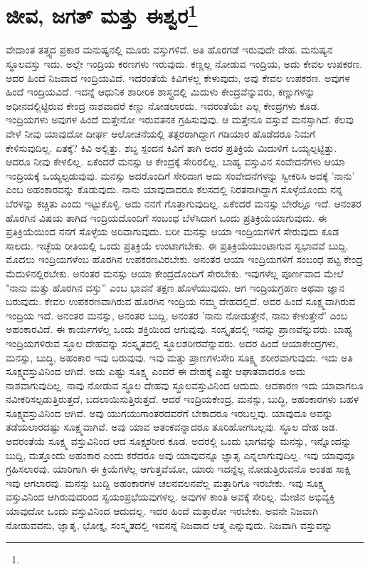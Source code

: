 
\chapter[ಜೀವ, ಜಗತ್ ಮತ್ತು ಈಶ್ವರ]{ಜೀವ, ಜಗತ್ ಮತ್ತು ಈಶ್ವರ\protect\footnote{}}

ವೇದಾಂತ ತತ್ತ್ವದ ಪ್ರಕಾರ ಮನುಷ್ಯನಲ್ಲಿ ಮೂರು ವಸ್ತುಗಳಿವೆ. ಅತಿ ಹೊರಗಡೆ ಇರುವುದೇ ದೇಹ. ಮನುಷ್ಯನ ಸ್ಥೂಲವಸ್ತು ಇದು. ಅಲ್ಲೇ ಇಂದ್ರಿಯ ಕರಣಗಳು ಇರುವುದು. ಕಣ್ಣಲ್ಲ ನೋಡುವ ಇಂದ್ರಿಯ, ಅದು ಕೇವಲ ಉಪಕರಣ. ಅದರ ಹಿಂದೆ ನಿಜವಾದ ಇಂದ್ರಿಯವಿದೆ. ಇದರಂತೆಯೆ ಕಿವಿಗಳಲ್ಲ ಕೇಳುವುದು, ಅವು ಕೇವಲ ಉಪಕರಣ. ಅವುಗಳ ಹಿಂದೆ ಇಂದ್ರಿಯವಿದೆ. ಇದನ್ನೆ ಆಧುನಿಕ ಶಾರೀರಿಕ ಶಾಸ್ತ್ರದಲ್ಲಿ ಮಿದುಳು ಕೇಂದ್ರವೆನ್ನುವರು, ಕಣ್ಣುಗಳನ್ನು ಅಧೀನದಲ್ಲಿಟ್ಟಿರುವ ಕೇಂದ್ರ ನಾಶವಾದರೆ ಕಣ್ಣು ನೋಡಲಾರದು. ಇದರಂತೆಯೇ ಎಲ್ಲ ಕೇಂದ್ರಗಳು ಕೂಡ. ಇಂದ್ರಿಯಗಳು ಅವುಗಳ ಹಿಂದೆ ಮತ್ತೇನೋ ಇರುವತನಕ ಗ್ರಹಿಸುವುವು. ಆ ಮತ್ತೇನೂ ವಸ್ತುವೆ ಮನಸ್ಸಾಗಿದೆ. ಕೆಲವು ವೇಳೆ ನೀವು ಯಾವುದೋ ದೀರ್ಘ ಆಲೋಚನೆಯಲ್ಲಿ ತತ್ಪರರಾಗಿದ್ದಾಗ ಗಡಿಯಾರ ಹೊಡೆದರೂ ನಿಮಗೆ ಕೇಳಿಸುವುದಿಲ್ಲ. ಏತಕ್ಕೆ? ಕಿವಿ ಅಲ್ಲಿತ್ತು. ಶಬ್ದ ಸ್ಪಂದನ ಕಿವಿಗೆ ತಾಗಿ ಅದರ ಪ್ರತಿಕ್ರಿಯೆ ಮಿದುಳಿಗೆ ಒಯ್ಯಲ್ಪಟ್ಟಿತ್ತು. ಆದರೂ ನೀವು ಕೇಳಲಿಲ್ಲ. ಏಕೆಂದರೆ ಮನಸ್ಸು ಆ ಕೇಂದ್ರಕ್ಕೆ ಸೇರಿರಲಿಲ್ಲ. ಬಾಹ್ಯ ವಸ್ತುವಿನ ಸಂವೇದನೆಗಳು ಆಯಾ ಇಂದ್ರಿಯಕ್ಕೆ ಒಯ್ಯಲ್ಪಡುವುವು. ಮನಸ್ಸು ಅದರೊಂದಿಗೆ ಸೇರಿದಾಗ ಅದು ಸಂವೇದನೆಗಳನ್ನು ಸ್ವೀಕರಿಸಿ ಅದಕ್ಕೆ 'ನಾನು' ಎಂಬ ಅಹಂಕಾರವನ್ನು ಕೊಡುವುದು. ನಾನು ಯಾವುದಾದರೂ ಕೆಲಸದಲ್ಲಿ ನಿರತನಾಗಿದ್ದಾಗ ಸೊಳ್ಳೆಯೊಂದು ನನ್ನ ಬೆರಳನ್ನು ಕಚ್ಚಿತು ಎಂದು ಇಟ್ಟುಕೊಳ್ಳಿ. ಅದು ನನಗೆ ಗೊತ್ತಾಗುವುದಿಲ್ಲ. ಏಕೆಂದರೆ ಮನಸ್ಸು ಬೇರೆಲ್ಲೂ ಇದೆ. ಆನಂತರ ಹೊರಗಿನ ವಿಷಯ ತಾಗಿದ ಇಂದ್ರಿಯದೊಂದಿಗೆ ಸಂಬಂಧ ಬೆಳೆಸಿದಾಗ ಒಂದು ಪ್ರತಿಕ್ರಿಯೆಯಾಗುವುದು. ಈ ಪ್ರತಿಕ್ರಿಯೆಯಿಂದ ನನಗೆ ಸೊಳ್ಳೆಯ ಅರಿವಾಗುವುದು. ಬರೀ ಮನಸ್ಸು ಆಯಾ ಇಂದ್ರಿಯಗಳಿಗೆ ಸೇರುವುದು ಕೂಡ ಸಾಲದು. ಇಚ್ಛೆಯ ರೀತಿಯಲ್ಲಿ ಒಂದು ಪ್ರತಿಕ್ರಿಯೆ ಉಂಟಾಗಬೇಕು. ಈ ಪ್ರತಿಕ್ರಿಯೆಯುಂಟಾಗುವ ಸ್ವಭಾವವೆ ಬುದ್ದಿ. ಮೊದಲು ಇಂದ್ರಿಯಗಳೆಂಬ ಹೊರಗಿನ ಉಪಕರಣವಿರಬೇಕು. ಅನಂತರ ಆಯಾ ಇಂದ್ರಿಯಗಳಿಗೆ ಸಂಬಂಧ ಪಟ್ಟ ಕೇಂದ್ರ ಮೆದುಳಿನಲ್ಲಿರಬೇಕು. ಅನಂತರ ಮನಸ್ಸು ಆಯಾ ಕೇಂದ್ರದೊಂದಿಗೆ ಸೇರಬೇಕು. ಇವುಗಳೆಲ್ಲ ಪೂರ್ಣವಾದ ಮೇಲೆ "ನಾನು ಮತ್ತು ಹೊರಗಿನ ವಸ್ತು” ಎಂಬ ಭಾವನೆ ತಕ್ಷಣ ಹೊಳೆಯುವುದು. ಆಗ ಇಂದ್ರಿಯಗ್ರಹಣ ಅಥವಾ ಜ್ಞಾನ ಬರುವುದು. ಕೇವಲ ಉಪಕರಣವಾಗಿರುವ ಹೊರಗಿನ ಇಂದ್ರಿಯ ನಮ್ಮ ದೇಹದಲ್ಲಿದೆ. ಅದರ ಹಿಂದೆ ಸೂಕ್ಷ್ಮವಾಗಿರುವ ಇಂದ್ರಿಯ ಇದೆ. ಅನಂತರ ಮನಸ್ಸು, ಅನಂತರ ಬುದ್ದಿ, ಅನಂತರ 'ನಾನು ನೋಡುತ್ತೇನೆ, ನಾನು ಕೇಳುತ್ತೇನೆ' ಎಂಬ ಅಹಂಕಾರವಿದೆ. ಈ ಕಾರ್ಯಗಳೆಲ್ಲ ಒಂದು ಶಕ್ತಿಯಿಂದ ಆಗುವುವು. ಸಂಸ್ಕೃತದಲ್ಲಿ ಇದನ್ನು ಪ್ರಾಣವೆನ್ನುವರು. ಬಾಹ್ಯ ಇಂದ್ರಿಯಗಳಿರುವ ಸ್ಥೂಲ ದೇಹವನ್ನು ಸಂಸ್ಕೃತದಲ್ಲಿ ಸ್ಥೂಲಶರೀರವೆನ್ನುವರು. ಅದರ ಹಿಂದೆ ಆಯಾ\break ಕೇಂದ್ರಗಳು, ಮನಸ್ಸು, ಬುದ್ಧಿ, ಅಹಂಕಾರ ಇವು ಬರುವುವು. ಇವು ಮತ್ತು ಪ್ರಾಣಗಳು\break ಸೇರಿ ಸೂಕ್ಷ್ಮ ಶರೀರವಾಗುವುದು. ಇದು ಅತಿ ಸೂಕ್ಷ್ಮವಸ್ತುವಿನಿಂದ ಆಗಿದೆ. ಅದು ಎಷ್ಟು ಸೂಕ್ಷ್ಮ ಎಂದರೆ ಈ ದೇಹಕ್ಕೆ ಎಷ್ಟೇ ಆಘಾತವಾದರೂ ಅದು ನಾಶವಾಗುವುದಿಲ್ಲ. ನಾವು ನೋಡುವ ಸ್ಥೂಲ ದೇಹವು ಸ್ಥೂಲವಸ್ತುವಿನಿಂದ ಆದುದು. ಆದಕಾರಣ ಇದು ಯಾವಾಗಲೂ ನವೀಕರಿಸಲ್ಪಡುತ್ತಿರುತ್ತದೆ, ಬದಲಾಯಿಸುತ್ತಿರುತ್ತದೆ. ಆದರೆ ಇಂದ್ರಿಯಕೇಂದ್ರ, ಮನಸ್ಸು, ಬುದ್ಧಿ, ಅಹಂಕಾರಗಳು ಬಹಳ ಸೂಕ್ಷ್ಮವಸ್ತುವಿನಿಂದ ಆಗಿವೆ. ಅವು ಯುಗಯುಗಾಂತರದವರೆಗೆ ಬೇಕಾದರೂ ಇರಬಲ್ಲವು. ಯಾವುದೂ ಅವನ್ನು ತಡೆಯಲಾರದಷ್ಟು ಸೂಕ್ಷ್ಮವಾಗಿವೆ. ಅವು ಯಾವ ಆತಂಕವನ್ನಾದರೂ ತೂರಿಹೋಗಬಲ್ಲವು. ಸ್ಥೂಲ ದೇಹ ಜಡ. ಅದರಂತೆಯೆ ಸೂಕ್ಷ್ಮ ವಸ್ತುವಿನಿಂದ ಆದ ಸೂಕ್ಷ್ಮಶರೀರ ಕೂಡ. ಅದರಲ್ಲಿ ಒಂದು ಭಾಗವನ್ನು ಮನಸ್ಸು, ಇನ್ನೊಂದನ್ನು ಬುದ್ದಿ, ಮತ್ತೊಂದು ಅಹಂಕಾರ ಎಂದು ಕರೆದರೂ ಅವು ಯಾವುವನ್ನೂ ಜ್ಞಾತೃ ಎನ್ನಲಾಗುವುದಿಲ್ಲ. ಇವು ಯಾವುವೂ ಗ್ರಹಿಸಲಾರವು. ಯಾರಿಗಾಗಿ ಈ ಕ್ರಿಯೆಗಳೆಲ್ಲ ಆಗುತ್ತವೆಯೋ, ಯಾರು ಇದನ್ನೆಲ್ಲ ನೋಡುತ್ತಿರುವನೊ ಅಂತಹ ಸಾಕ್ಷಿ ಇವು ಆಗಲಾರವು. ಮನಸ್ಸು ಬುದ್ದಿ ಅಹಂಕಾರಗಳ ಚಲನವಲನವೆಲ್ಲ ಮತ್ತಾರಿಗೊ ಇರಬೇಕು. ಇವು ಸೂಕ್ಷ್ಮ ವಸ್ತುವಿನಿಂದ ಆಗಿರುವುದರಿಂದ ಸ್ವಯಂಪ್ರಭೆಯವುಗಳಲ್ಲ. ಅವುಗಳ ಕಾಂತಿ ಅವಕ್ಕೆ ಸೇರಿಲ್ಲ. ಮೇಜಿನ ಅಭಿವ್ಯಕ್ತಿ ಯಾವುದೋ ಒಂದು ವಸ್ತುವಿನಿಂದ ಆದುದಲ್ಲ. ಇದರ ಹಿಂದೆ ಮತ್ತಾರೋ ಇರಬೇಕು. ಅವನೇ ನಿಜವಾಗಿ ನೋಡುವವನು, ಜ್ಞಾತೃ, ಭೋಕ್ತೃ, ಸಂಸ್ಕೃತದಲ್ಲಿ ಇವನನ್ನೆ ನಿಜವಾದ ಆತ್ಮ ಎನ್ನುವುದು. ನಿಜವಾಗಿ ವಸ್ತುವನ್ನು 